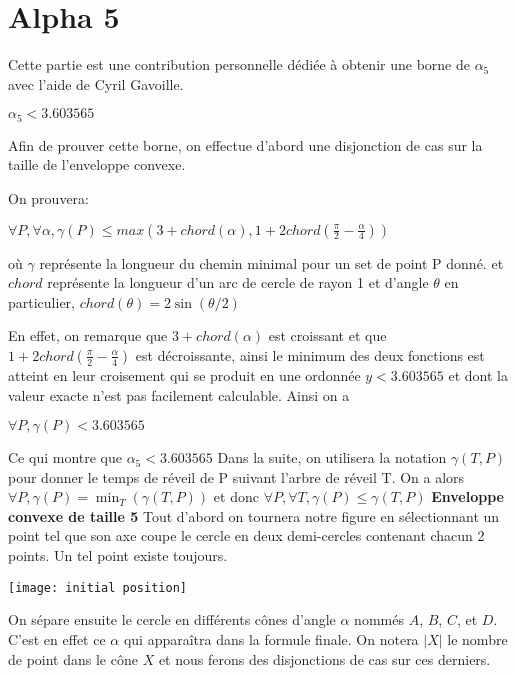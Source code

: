 \section{Alpha 5}

Cette partie est une contribution personnelle dédiée à obtenir une borne de $\alpha_5$ avec l'aide de Cyril Gavoille.

\(\alpha_5 < 3.603565\)

Afin de prouver cette borne, on effectue d'abord une disjonction de cas sur la taille de l'enveloppe convexe.

On prouvera:

\(\forall P, \forall \alpha, \gamma(P) \leq max(3 + chord(\alpha), 1 + 2chord(\frac{\pi}{2} - \frac{\alpha}{4})) \)

où $\gamma$ représente la longueur du chemin minimal pour un set de point P donné. et $chord$ représente la longueur d'un arc de cercle de rayon 1 et d'angle $\theta$ en particulier, $chord(\theta) = 2\sin(\theta/2)$

En effet, on remarque que $3+chord(\alpha)$ est croissant et que $1 + 2chord(\frac{\pi}{2} - \frac{\alpha}{4})$ est décroissante, ainsi le minimum des deux fonctions est atteint en leur croisement qui se produit en une ordonnée $y < 3.603565$ et dont la valeur exacte n'est pas facilement calculable. Ainsi on a

\(\forall P, \gamma(P) < 3.603565\)

Ce qui montre que $\alpha_5 < 3.603565$
\newline
\newline
Dans la suite, on utilisera la notation $\gamma(T, P)$ pour donner le temps de réveil de P suivant l'arbre de réveil T.
On a alors $\forall P, \gamma(P) = \min_T(\gamma(T,P))$
et donc $\forall P, \forall T, \gamma(P) \leq \gamma(T, P)$
\newline
\newline
\textbf{\Large{Enveloppe convexe de taille 5}}
\newline
\newline
Tout d'abord on tournera notre figure en sélectionnant un point tel que son axe coupe le cercle en deux demi-cercles contenant chacun 2 points. Un tel point existe toujours.

\texttt{[image: initial position]}

On sépare ensuite le cercle en différents cônes d'angle $\alpha$ nommés $A$, $B$, $C$, et $D$. C'est en effet ce $\alpha$ qui apparaîtra dans la formule finale. On notera $|X|$ le nombre de point dans le cône $X$ et nous ferons des disjonctions de cas sur ces derniers.

